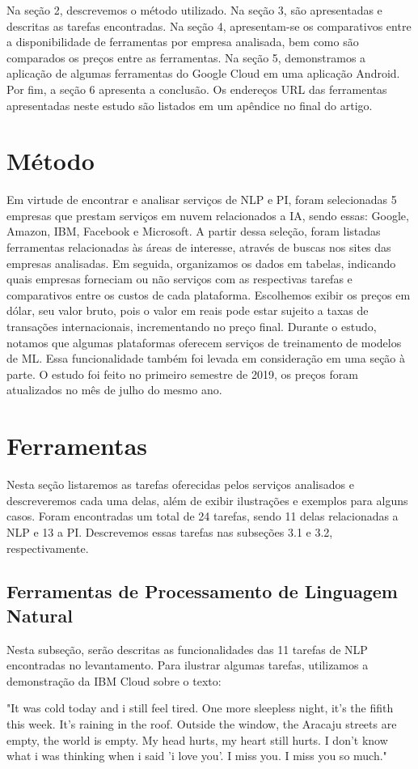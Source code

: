 \documentclass{article}
\begin{document}
\newline
Na seção 2, descrevemos o método utilizado. Na seção 3, são apresentadas e descritas as tarefas encontradas. Na seção 4, apresentam-se os comparativos entre a disponibilidade de ferramentas por empresa analisada, bem como são comparados os preços entre as ferramentas. Na seção 5, demonstramos a aplicação de algumas ferramentas do Google Cloud em uma aplicação Android. Por fim, a seção 6 apresenta a conclusão. Os endereços URL das ferramentas apresentadas neste estudo são listados em um apêndice no final do artigo.

\section{Método}
Em virtude de encontrar e analisar serviços de NLP e PI, foram selecionadas 5 empresas que prestam serviços em nuvem relacionados a IA, sendo essas: Google, Amazon, IBM, Facebook e Microsoft. A partir dessa seleção, foram listadas ferramentas relacionadas às áreas de interesse, através de buscas nos sites das empresas analisadas. Em seguida, organizamos os dados em tabelas, indicando quais empresas forneciam ou não serviços com as respectivas tarefas e comparativos entre os custos de cada plataforma. Escolhemos exibir os preços em dólar, seu valor bruto, pois o valor em reais pode estar sujeito a taxas de transações internacionais, incrementando no preço final. Durante o estudo, notamos que algumas plataformas oferecem serviços de treinamento de modelos de ML. Essa funcionalidade também foi levada em consideração em uma seção à parte. O estudo foi feito no primeiro semestre de 2019, os preços foram atualizados no mês de julho do mesmo ano.

\section{Ferramentas}
Nesta seção listaremos as tarefas oferecidas pelos serviços analisados e descreveremos cada uma delas, além de exibir ilustrações e exemplos para alguns casos. Foram encontradas um total de 24 tarefas, sendo 11 delas relacionadas a NLP e 13 a PI. Descrevemos essas tarefas nas subseções 3.1 e 3.2, respectivamente.

\subsection{Ferramentas de Processamento de Linguagem Natural}

Nesta subseção, serão descritas as funcionalidades das 11 tarefas de NLP encontradas no levantamento. Para ilustrar algumas tarefas, utilizamos a demonstração da IBM Cloud sobre o texto: 
\begin{myquote}
        "It was cold today and i still feel tired. One more sleepless night, it's the fifith this week. It's raining in the roof. Outside the window, the Aracaju streets are empty, the world is empty. My head hurts, my heart still hurts. I don't know what i was thinking when i said 'i love you'. I miss you. I miss you so much."
\end{myquote}
\end{document}
